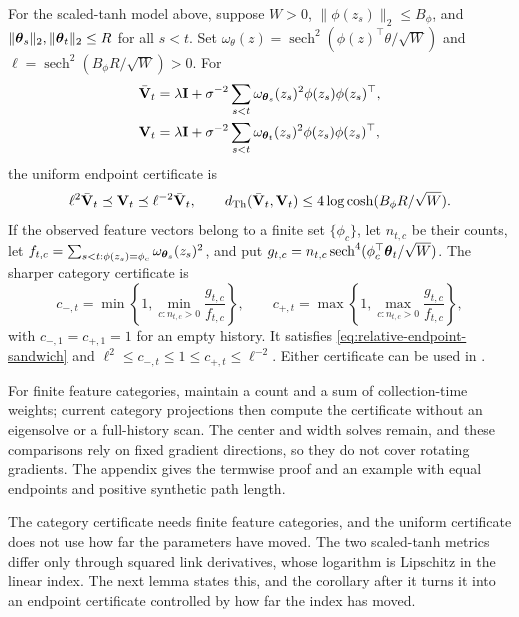 \begin{corollary}
\label{cor:tanh-relative-weights}
For the scaled-tanh model above, suppose $W>0$, $\|\phi(z_s)\|_2\le B_\phi$,
and $\|\boldsymbol{\theta}_s\|_2,\|\boldsymbol{\theta}_t\|_2\le R$ for all $s<t$.
Set $\omega_\theta(z)=\operatorname{sech}^2(\phi(z)^\top\theta/\sqrt W)$ and
$\ell=\operatorname{sech}^2(B_\phi R/\sqrt W)>0$.  For
\begin{align*}
 \bar{\mathbf{V}}_t&=\lambda\mathbf{I}+\sigma^{-2}\sum_{s<t}
 \omega_{\boldsymbol{\theta}_s}(z_s)^2\phi(z_s)\phi(z_s)^\top,\\
 \mathbf{V}_t&=\lambda\mathbf{I}+\sigma^{-2}\sum_{s<t}
 \omega_{\boldsymbol{\theta}_t}(z_s)^2\phi(z_s)\phi(z_s)^\top,
\end{align*}
the uniform endpoint certificate is
\begin{equation}\label{eq:tanh-uniform-relative}
 \ell^2\bar{\mathbf{V}}_t\preceq\mathbf{V}_t\preceq\ell^{-2}\bar{\mathbf{V}}_t,
 \qquad d_{\rm Th}(\bar{\mathbf{V}}_t,\mathbf{V}_t)
 \le4\log\cosh(B_\phi R/\sqrt W).
\end{equation}
If the observed feature vectors belong to a finite set $\{\phi_c\}$, let
$n_{t,c}$ be their counts, let
$f_{t,c}=\sum_{s<t:\phi(z_s)=\phi_c}\omega_{\boldsymbol{\theta}_s}(z_s)^2$, and put
$g_{t,c}=n_{t,c}\operatorname{sech}^4(\phi_c^\top\boldsymbol{\theta}_t/\sqrt W)$.
The sharper category certificate is
\begin{equation}\label{eq:tanh-category-relative}
 c_{-,t}=\min\!\left\{1,\min_{c:n_{t,c}>0}\frac{g_{t,c}}{f_{t,c}}\right\},
 \qquad
 c_{+,t}=\max\!\left\{1,\max_{c:n_{t,c}>0}\frac{g_{t,c}}{f_{t,c}}\right\},
\end{equation}
with $c_{-,1}=c_{+,1}=1$ for an empty history.  It satisfies
\eqref{eq:relative-endpoint-sandwich} and
$\ell^2\le c_{-,t}\le1\le c_{+,t}\le\ell^{-2}$.
Either certificate can be used in .
\end{corollary}

For finite feature categories, maintain a count and a sum of collection-time
weights; current category projections then compute the certificate without
an eigensolve or a full-history scan. The center and width solves remain, and
these comparisons rely on fixed gradient directions, so they do not cover
rotating gradients. The appendix gives the termwise proof
and an example with equal endpoints and positive synthetic path length.

The category certificate needs finite feature categories, and the uniform
certificate does not use how far the parameters have moved. The two
scaled-tanh metrics differ only through squared link derivatives, whose
logarithm is Lipschitz in the linear index. The next lemma states this, and
the corollary after it turns it into an endpoint certificate controlled by
how far the index has moved.

